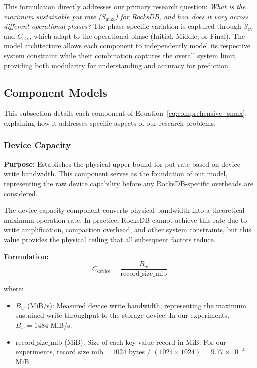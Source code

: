 \documentclass[11pt]{article}
\begin{document}
This formulation directly addresses our primary research question: \textit{What is the maximum sustainable put rate ($S_{\max}$) for RocksDB, and how does it vary across different operational phases?} The phase-specific variation is captured through $S_{\text{cv}}$ and $C_{\text{ctx}}$, which adapt to the operational phase (Initial, Middle, or Final). The model architecture allows each component to independently model its respective system constraint while their combination captures the overall system limit, providing both modularity for understanding and accuracy for prediction.

\subsection{Component Models}

This subsection details each component of Equation~\ref{eq:comprehensive_smax}, explaining how it addresses specific aspects of our research problems.

\subsubsection{Device Capacity}
\textbf{Purpose:} Establishes the physical upper bound for put rate based on device write bandwidth. This component serves as the foundation of our model, representing the raw device capability before any RocksDB-specific overheads are considered.

The device capacity component converts physical bandwidth into a theoretical maximum operation rate. In practice, RocksDB cannot achieve this rate due to write amplification, compaction overhead, and other system constraints, but this value provides the physical ceiling that all subsequent factors reduce.

\textbf{Formulation:}
\begin{equation}
C_{\text{device}} = \frac{B_w}{\text{record\_size\_mib}}
\label{eq:device_capacity}
\end{equation}

where:
\begin{itemize}
    \item $B_w$ (MiB/s): Measured device write bandwidth, representing the maximum sustained write throughput to the storage device. In our experiments, $B_w = 1484$ MiB/s.
    \item $\text{record\_size\_mib}$ (MiB): Size of each key-value record in MiB. For our experiments, $\text{record\_size\_mib} = 1024$ bytes / $(1024 \times 1024)$ = $9.77 \times 10^{-4}$ MiB.
\end{itemize}
\end{document}
